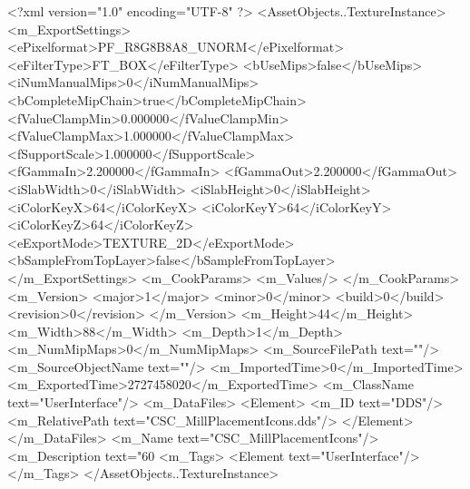 <?xml version="1.0" encoding="UTF-8" ?>
<AssetObjects..TextureInstance>
	<m_ExportSettings>
		<ePixelformat>PF_R8G8B8A8_UNORM</ePixelformat>
		<eFilterType>FT_BOX</eFilterType>
		<bUseMips>false</bUseMips>
		<iNumManualMips>0</iNumManualMips>
		<bCompleteMipChain>true</bCompleteMipChain>
		<fValueClampMin>0.000000</fValueClampMin>
		<fValueClampMax>1.000000</fValueClampMax>
		<fSupportScale>1.000000</fSupportScale>
		<fGammaIn>2.200000</fGammaIn>
		<fGammaOut>2.200000</fGammaOut>
		<iSlabWidth>0</iSlabWidth>
		<iSlabHeight>0</iSlabHeight>
		<iColorKeyX>64</iColorKeyX>
		<iColorKeyY>64</iColorKeyY>
		<iColorKeyZ>64</iColorKeyZ>
		<eExportMode>TEXTURE_2D</eExportMode>
		<bSampleFromTopLayer>false</bSampleFromTopLayer>
	</m_ExportSettings>
	<m_CookParams>
		<m_Values/>
	</m_CookParams>
	<m_Version>
		<major>1</major>
		<minor>0</minor>
		<build>0</build>
		<revision>0</revision>
	</m_Version>
	<m_Height>44</m_Height>
	<m_Width>88</m_Width>
	<m_Depth>1</m_Depth>
	<m_NumMipMaps>0</m_NumMipMaps>
	<m_SourceFilePath text=""/>
	<m_SourceObjectName text=""/>
	<m_ImportedTime>0</m_ImportedTime>
	<m_ExportedTime>2727458020</m_ExportedTime>
	<m_ClassName text="UserInterface"/>
	<m_DataFiles>
		<Element>
			<m_ID text="DDS"/>
			<m_RelativePath text="CSC_MillPlacementIcons.dds"/>
		</Element>
	</m_DataFiles>
	<m_Name text="CSC_MillPlacementIcons"/>
	<m_Description text="60%
	<m_Tags>
		<Element text="UserInterface"/>
	</m_Tags>
</AssetObjects..TextureInstance>
